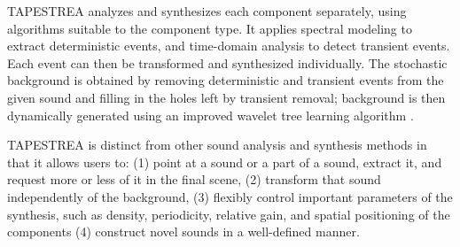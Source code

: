 \documentclass[twoside]{article}
\begin{document}

TAPESTREA analyzes and synthesizes each component separately, using algorithms suitable 
to the component type. It applies spectral modeling \cite{paper:85:Serra89} to extract deterministic 
events, and time-domain analysis to detect transient events. Each event can then be 
transformed and synthesized individually. The stochastic background is obtained by 
removing deterministic and transient events from the given sound and filling in the 
holes left by transient removal; background is then dynamically generated using an improved wavelet 
tree learning algorithm \cite{paper:85:Dubnov02}.

TAPESTREA is distinct from other sound analysis and synthesis methods in that it allows users to:
(1) point at a sound or a part of a sound, extract it, and request more or less of it in the final scene,
(2) transform that sound independently of the background,
(3) flexibly control important parameters of the synthesis, such as density, periodicity, relative gain, and spatial positioning of the components
(4) construct novel sounds in a well-defined manner.


\end{document}

